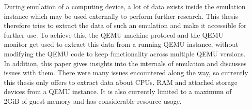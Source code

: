 
\Abstract
During emulation of a computing device,
a lot of data exists inside the emulation instance which may be used externally to perform further research.
This thesis therefore tries to extract the data of such an emulation and make it accessible for further use.
To achieve this, the QEMU machine protocol and the QEMU monitor get used to extract this data from a running QEMU instance,
without modifying the QEMU code to keep functionality across multiple QEMU versions.
In addition, this paper gives insights into the internals of emulation and discusses issues with them.
There were many issues encountered along the way,
so currently this thesis only offers to extract data about CPUs, RAM and attached storage devices from a QEMU instance.
It is also currently limited to a maximum of 2GiB of guest memory and has considerable resource usage.